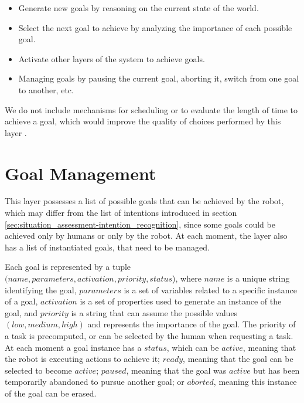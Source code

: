 \begin{itemize}
\item Generate new goals by reasoning on the current state of the world.
\item Select the next goal to achieve by analyzing the importance of each possible goal.
\item Activate other layers of the system to achieve goals.
\item Managing goals by pausing the current goal, aborting it, switch from one goal to another, etc.
\end{itemize}


We do not include mechanisms for scheduling or to evaluate the length of time to achieve a goal, which would improve the quality of choices performed by this layer .

\section{Goal Management}
\label{sec:goal_management-choosing}
This layer possesses a list of possible goals that can be achieved by the robot, which may differ from the list of intentions introduced in section \ref{sec:situation_assessment-intention_recognition}, since some goals could be achieved only by humans or only by the robot. At each moment, the layer also has a list of instantiated goals, that need to be managed.

Each goal is represented by a tuple $(name, parameters, activation, priority, status$), where $name$ is a unique string identifying the goal, $parameters$ is a set of variables related to a specific instance of a goal, $activation$ is a set of properties used to generate an instance of the goal, and $priority$ is a string that can assume the possible values $(low, medium, high)$ and represents the importance of the goal. The priority of a task is precomputed, or can be selected by the human when requesting a task. At each moment a goal instance has a $status$, which can be $active$, meaning that the robot is executing actions to achieve it; $ready$, meaning that the goal can be selected to become $active$; $paused$, meaning that the goal was $active$ but has been temporarily abandoned to pursue another goal; or $aborted$, meaning this instance of the goal can be erased.  

